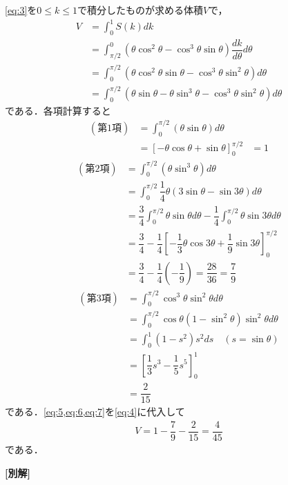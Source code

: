 \documentclass[../../main.tex]{subfiles}
\begin{document}
\cref{eq:3}を$0\le k\le 1$で積分したものが求める体積$V$で，
\begin{align}
  V
  &=\int_{0}^{1} S(k)dk \\
  &=\int_{\pi/2}^{0}(\theta \cos^2\theta-\cos^3\theta\sin\theta)\dfrac{dk}{d\theta}d\theta \\
  &=\int_0^{\pi/2}(\theta \cos^2\theta\sin\theta -\cos^3\theta\sin^2\theta)d\theta \\
  &=\int_0^{\pi/2}(\theta \sin\theta - \theta \sin^3\theta -\cos^3\theta\sin^2\theta)d\theta \label{eq:4}
\end{align}
である．各項計算すると
\begin{align}
  (\text{第1項})
  &= \int_{0}^{\pi/2} \left(\theta \sin\theta \right) d\theta \\
  &= \left[-\theta\cos\theta + \sin\theta\right]_{0}^{\pi/2}
  &= 1 \label{eq:5}
\end{align}
\begin{align}
  (\text{第2項})
  &= \int_{0}^{\pi/2} \left(\theta \sin^3\theta \right) d\theta \\
  &= \int_{0}^{\pi/2} \dfrac{1}{4}\theta\left(3 \sin\theta - \sin 3\theta\right) d\theta \\
  &= \dfrac{3}{4}\int_{0}^{\pi/2}\theta\sin\theta d\theta - \dfrac{1}{4}\int_{0}^{\pi/2}\theta\sin 3\theta d\theta \\
  &= \dfrac{3}{4} - \dfrac{1}{4}\left[-\dfrac{1}{3}\theta\cos 3\theta + \dfrac{1}{9}\sin 3\theta \right]_{0}^{\pi/2} \\
  &= \dfrac{3}{4} - \dfrac{1}{4}\left(-\dfrac{1}{9}\right) = \dfrac{28}{36} = \dfrac{7}{9} \label{eq:6}
\end{align}
\begin{align}
  (\text{第3項})
  &= \int_{0}^{\pi/2}\cos^3\theta \sin^2\theta d\theta \\
  &= \int_{0}^{\pi/2}\cos\theta (1-\sin^2\theta)\sin^2\theta d\theta \\
  &= \int_{0}^{1} (1-s^2)s^2 ds \quad (s = \sin\theta) \\
  &= \left[\dfrac{1}{3}s^3 - \dfrac{1}{5}s^5\right]_{0}^{1} \\
  &= \dfrac{2}{15} \label{eq:7}
\end{align}
である．\cref{eq:5,eq:6,eq:7}を\cref{eq:4}に代入して
\begin{align}
  V = 1 - \dfrac{7}{9} - \dfrac{2}{15} = \dfrac{4}{45}
\end{align}
である．

{\bf [別解]}
\end{document}

